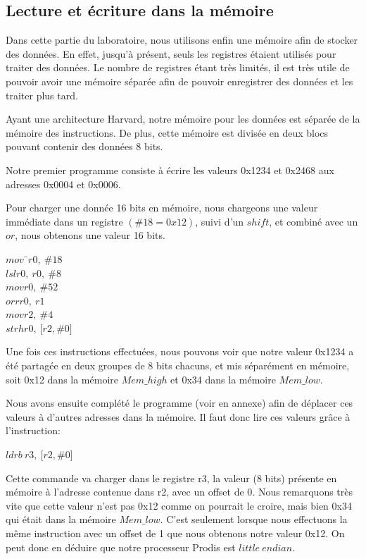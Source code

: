 \documentclass[11pt,a4paper]{article}
\begin{document}
\newpage
\subsection{Lecture et écriture dans la mémoire}

Dans cette partie du laboratoire, nous utilisons enfin une mémoire afin de stocker des données. En effet, jusqu'à présent, seuls les registres étaient utilisés pour traiter des données. Le nombre de registres étant très limités, il est très utile de pouvoir avoir une mémoire séparée afin de pouvoir enregistrer des données et les traiter plus tard. 

Ayant une architecture Harvard, notre mémoire pour les données est séparée de la mémoire des instructions. De plus, cette mémoire est divisée en deux blocs pouvant contenir des données 8 bits.

Notre premier programme consiste à écrire les valeurs 0x1234 et 0x2468 aux adresses 0x0004 et 0x0006.

Pour charger une donnée 16 bits en mémoire, nous chargeons une valeur immédiate dans un registre $(\#18 = 0x12)$, suivi d'un $shift$, et combiné avec un $or$, nous obtenons une valeur 16 bits.

\begin{tabbing}
$mov\ \ $\=$r0,\ \#18$ \\
$lsl$\>$r0,\ r0,\ \#8$ \\
$mov$\>$r0,\ \#52$ \\
$orr$\>$r0,\ r1$ \\
$mov$\>$r2,\ \#4$ \\
$strh$\>$r0,\ \lbrack r2,\#0 \rbrack$ \\
\end{tabbing}

Une fois ces instructions effectuées, nous pouvons voir que notre valeur 0x1234 a été partagée en deux groupes de 8 bits chacuns, et mis séparément en mémoire, soit 0x12 dans la mémoire $Mem\_high$ et 0x34 dans la mémoire $Mem\_low$.

Nous avons ensuite complété le programme (voir en annexe) afin de déplacer ces valeurs à d'autres adresses dans la mémoire. Il faut donc lire ces valeurs grâce à l'instruction: 

$ldrb\ r3,\ \lbrack r2,\#0\rbrack $

Cette commande va charger dans le registre r3, la valeur (8 bits) présente en mémoire à l'adresse contenue dans r2, avec un offset de 0. Nous remarquons très vite que cette valeur n'est pas 0x12 comme on pourrait le croire, mais bien 0x34 qui était dans la mémoire $Mem\_low$. C'est seulement lorsque nous effectuons la même instruction avec un offset de 1 que nous obtenons notre valeur 0x12. On peut donc en déduire que notre processeur Prodis est $little\ endian$.
\end{document}
